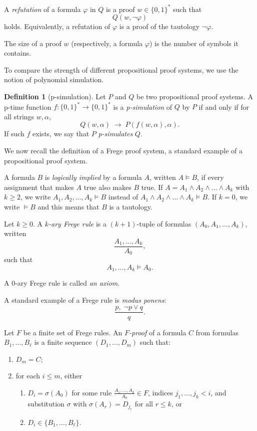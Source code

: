 \documentclass{article}
\theoremstyle{plain}
\theoremstyle{definition}
\newtheorem{definition}[theorem]{Definition}
\begin{document}
A \emph{refutation} of a formula $\varphi$ in $Q$ is a proof 
$w \in \{0,1\}^*$ such that 
\[
Q(w,\neg \varphi)
\]
holds. 
Equivalently, a refutation of $\varphi$ is a proof of the tautology 
$\neg \varphi$.


The size of a proof $w$ (respectively, a formula $\varphi$) is the number of symbols it contains.

To compare the strength of different propositional proof systems, we use the notion
of polynomial simulation.

\begin{definition}[p-simulation]
Let $P$ and $Q$ be two propositional proof systems.  
A p-time function $f : \{0,1\}^* \to \{0,1\}^*$ is a \emph{p-simulation} of $Q$ by $P$ if and only if for all strings $w, \alpha$,
\[
    Q(w,\alpha) \;\rightarrow\; P(f(w,\alpha), \alpha).
\]
If such $f$ exists, we say that $P$ \emph{p-simulates} $Q$.
\end{definition}

We now recall the definition of a Frege proof system, a standard example of a propositional proof system.


A formula $B$ is \emph{logically implied} by a formula $A$, written $A \models B$, if every assignment that makes $A$ true also makes $B$ true. 
If $A = A_1 \wedge A_2 \wedge \dots \wedge A_k$ with $k \geq 2$, we write $A_1, A_2, \dots, A_k \models B$ instead of $A_1 \wedge A_2 \wedge \dots \wedge A_k \models B$.  If $k=0$, we write $\models B$ and this means that $B$ is a tautology.



Let $k \ge 0$.  
A \emph{$k$-ary Frege rule} is a $(k+1)$-tuple of formulas $(A_0,A_1,\dots,A_k)$, written
\[
\frac{A_1,\dots,A_k}{A_0},
\]
such that
\[
A_1,\dots,A_k \models A_0.
\]

A $0$-ary Frege rule is called \emph{an axiom}.


\medskip

A standard example of a Frege rule is \emph{modus ponens}:
\[
\frac{p,\;\neg p \vee q}{q}.
\]

Let $F$ be a finite set of Frege rules.
An \emph{$F$-proof} of a formula $C$ from formulas $B_1,\dots,B_\ell$ is a finite
sequence $(D_1,\dots,D_m)$ such that:
\begin{enumerate}
  \item $D_m = C$;
  \item for each $i \le m$, either
  \begin{enumerate}
    \item $D_i = \sigma(A_0)$ for some rule
    \(
      \frac{A_1,\dots,A_k}{A_0} \in F
    \), indices $j_1,\dots,j_k < i$, and substitution $\sigma$ with
    $\sigma(A_r)=D_{j_r}$ for all $r \le k$, or
    \item $D_i \in \{B_1,\dots,B_\ell\}$.
  \end{enumerate}
\end{enumerate}
\end{document}
